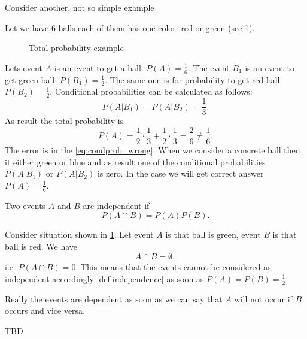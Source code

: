 Consider another, not so simple example
\begin{example}
Let we have 6 balls each of them has one color: red or green (see
\cref{fig:excondprobability_add}). 
\begin{figure}[H]
  \centering
  \caption{Total probability example}
  \label{fig:excondprobability_add}
\end{figure}
Lets event $A$ is an event to get a ball. $P(A) = \frac{1}{6}$. The
event $B_1$ is an event to get green ball: $P(B_1) = \frac{1}{2}$. The
same one is for probability to get red ball: $P(B_2) = \frac{1}{2}$.
Conditional probabilities can be calculated as follows:
\begin{equation}
P(A|B_1) = P(A|B_2) = \frac{1}{3}.
\label{eq:condprob_wrong}
\end{equation}
As result the total probability is 
\[
P(A) = \frac{1}{2}\cdot\frac{1}{3} + \frac{1}{2}\cdot\frac{1}{3} =
\frac{2}{6} \ne \frac{1}{6}.
\]
The error is in the \eqref{eq:condprob_wrong}. When we consider a
concrete ball then it either green or blue and as result one of the
conditional probabilities $P(A|B_1)$ or $P(A|B_2)$ is zero. In the
case we will get correct answer $P(A) = \frac{1}{6}$.
\end{example}

\begin{definition}[Independence]
\label{def:independence}
Two events $A$ and $B$ are independent if 
\[
P\left(A \cap B\right) = 
P\left(A\right) P\left(B\right). 
\]
\end{definition}

\begin{example}
Consider situation shown in \cref{fig:excondprobability_add}. Let
event $A$ is that ball is green, event $B$ is that ball is red. We
have
\[
A \cap B = \emptyset, 
\]
i.e. $P\left(A \cap B\right) = 0$. This means that the events cannot
be considered as independent accordingly \cref{def:independence} as
soon as $P\left(A\right) = 
P\left(B\right) = \frac{1}{2}$.

Really the events are dependent as soon as we can say that $A$ will
not occur if $B$ occurs and vice versa.
\end{example}

TBD \cite{bib:kolmogorov74basic}
